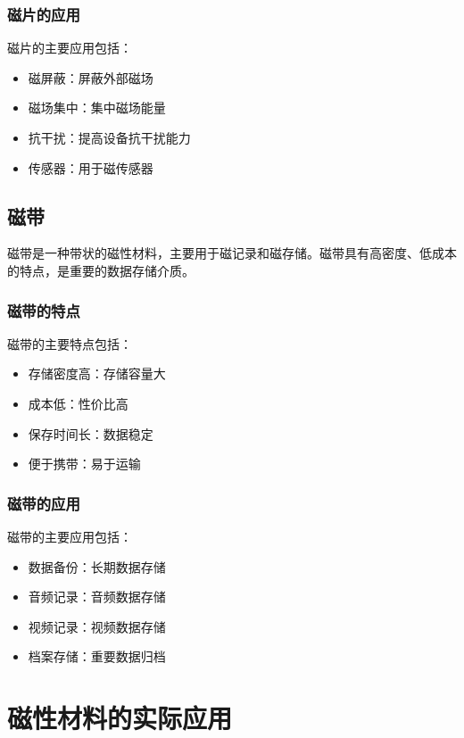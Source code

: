 \documentclass[12pt,UTF8]{ctexbook}
\begin{document}
\subsection{磁片的应用}

磁片的主要应用包括：

\begin{itemize}[leftmargin=2cm]
    \item 磁屏蔽：屏蔽外部磁场
    \item 磁场集中：集中磁场能量
    \item 抗干扰：提高设备抗干扰能力
    \item 传感器：用于磁传感器
\end{itemize}

\section{磁带}

磁带是一种带状的磁性材料，主要用于磁记录和磁存储。磁带具有高密度、低成本的特点，是重要的数据存储介质。

\subsection{磁带的特点}

磁带的主要特点包括：

\begin{itemize}[leftmargin=2cm]
    \item 存储密度高：存储容量大
    \item 成本低：性价比高
    \item 保存时间长：数据稳定
    \item 便于携带：易于运输
\end{itemize}

\subsection{磁带的应用}

磁带的主要应用包括：

\begin{itemize}[leftmargin=2cm]
    \item 数据备份：长期数据存储
    \item 音频记录：音频数据存储
    \item 视频记录：视频数据存储
    \item 档案存储：重要数据归档
\end{itemize}

\chapter{磁性材料的实际应用}
\end{document}
